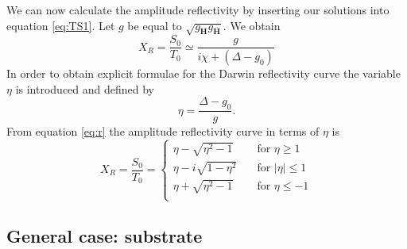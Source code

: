 \documentclass[12pt,oneside,notitlepage,abstracton,a4paper]{scrartcl}
\begin{document}
We can now calculate the amplitude reflectivity by inserting our solutions into equation \ref{eq:TS1}. Let $g$ be equal to $\sqrt{g_\mathbf{H}g_\mathbf{\bar{H}}}$. We obtain
\begin{equation}\label{eq:r}
X_R=\frac{S_0}{T_0} \simeq \frac{g}{i\chi+(\Delta-g_0)}
\end{equation}
In order to obtain explicit formulae for the Darwin reflectivity curve the variable $\eta$ is introduced and defined by
\begin{equation}
\eta=\frac{\Delta-g_0}{g}.
\end{equation}
From equation \ref{eq:r} the amplitude reflectivity curve in terms of $\eta$ is
\begin{equation}\label{eq:darwin}
 X_R=\frac{S_0}{T_0}=
 \begin{cases}
  \eta-\sqrt{\eta^2-1} & \quad \text{for } \eta\ge 1  \\
  \eta-i\sqrt{1-\eta^2} & \quad \text{for } |\eta|\le 1  \\
  \eta+\sqrt{\eta^2-1} & \quad \text{for } \eta\le -1  \\
 \end{cases}
\end{equation}



\subsection{General case: substrate}
\end{document}
